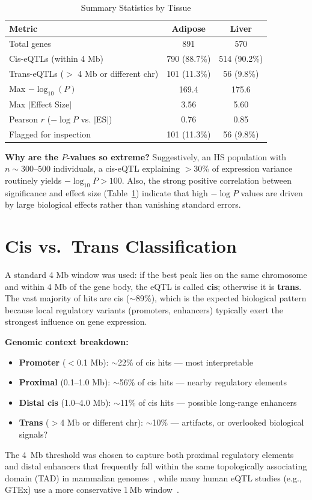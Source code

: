 \documentclass[11pt,a4paper]{article}
\begin{document}
\begin{table}[H]
\centering
\caption{Summary Statistics by Tissue}
\label{tab:summary}
\begin{tabular}{lcc}
\toprule
\textbf{Metric} & \textbf{Adipose} & \textbf{Liver} \\
\midrule
Total genes & 891 & 570 \\
Cis-eQTLs (within 4 Mb) & 790 (88.7\%) & 514 (90.2\%) \\
Trans-eQTLs ($>$ 4 Mb or different chr) & 101 (11.3\%) & 56 (9.8\%) \\
Max $-\log_{10}(P)$ & 169.4 & 175.6 \\
Max $|$Effect Size$|$ & 3.56 & 5.60 \\
Pearson $r$ ($-\log P$ vs. $|$ES$|$) & 0.76 & 0.85 \\
Flagged for inspection & 101 (11.3\%) & 56 (9.8\%) \\
\bottomrule
\end{tabular}
\end{table}

\noindent\textbf{Why are the $P$-values so extreme?} Suggestively, an HS population with $n \sim 300$--$500$ individuals, a cis-eQTL explaining $>$30\% of expression variance routinely yields $-\log_{10}P > 100$. Also, the strong positive correlation between significance and effect size  (Table~\ref{tab:summary}) indicate that high $-\log P$ values are driven by large biological effects rather than vanishing standard errors. 


\section{Cis vs.\ Trans Classification}

A standard 4 Mb window was used: if the best peak lies on the same chromosome and within 4 Mb of the gene body, the eQTL is called \textbf{cis}; otherwise it is \textbf{trans}. The vast majority of hits are cis ($\sim$89\%), which is the expected biological pattern because local regulatory variants (promoters, enhancers) typically exert the strongest influence on gene expression.

\noindent\textbf{Genomic context breakdown:}
\begin{itemize}
    \item \textbf{Promoter} ($<$0.1 Mb): $\sim$22\% of cis hits — most interpretable
    \item \textbf{Proximal} (0.1--1.0 Mb): $\sim$56\% of cis hits — nearby regulatory elements
    \item \textbf{Distal cis} (1.0--4.0 Mb): $\sim$11\% of cis hits — possible long-range enhancers
    \item \textbf{Trans} ($>$4 Mb or different chr): $\sim$10\% — artifacts, or overlooked biological signals? 
\end{itemize}
\noindent The 4\, Mb threshold was chosen to capture both proximal regulatory elements and distal enhancers that frequently fall within the same topologically associating domain (TAD) in mammalian genomes~\cite{dixon2012}, while many human eQTL studies (e.g., GTEx) use a more conservative 1\,Mb window~\cite{gtex2017}.
\end{document}
